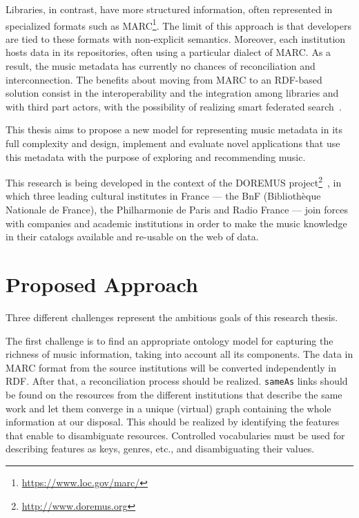 \documentclass{llncs}
\begin{document}
Libraries, in contrast, have more structured information, often represented in specialized formats such as MARC\footnote{\url{https://www.loc.gov/marc/}}. The limit of this approach is that developers are tied to these formats with non-explicit semantics. Moreover, each institution hosts data in its repositories, often using a particular dialect of MARC. As a result, the music metadata has currently no chances of reconciliation and interconnection. The benefits about moving from MARC to an RDF-based solution consist in the interoperability and the integration among libraries and with third part actors, with the possibility of realizing smart federated search~\cite{byrne2010strongest}.

This thesis aims to propose a new model for representing music metadata in its full complexity and design, implement and evaluate novel applications that use this metadata with the purpose of exploring and recommending music.

This research is being developed in the context of the DOREMUS project\footnote{\url{http://www.doremus.org}}~\cite{achichidoremus}, in which three leading cultural institutes in France --- the BnF (Biblioth\`eque Nationale de France), the Philharmonie de Paris and Radio France --- join forces with companies and academic institutions in order to make the music knowledge in their catalogs available and re-usable on the web of data.


\section{Proposed Approach}
\label{sec:approach}
Three different challenges represent the ambitious goals of this research thesis.

The first challenge is to find an appropriate ontology model for capturing the richness of music information, taking into account all its components. The data in MARC format from the source institutions will be converted independently in RDF. After that, a reconciliation process should be realized. \texttt{sameAs} links should be found on the resources from the different institutions that describe the same work and let them converge in a unique (virtual) graph containing the whole information at our disposal. This should be realized by identifying the features that enable to disambiguate resources. Controlled vocabularies must be used for describing features as keys, genres, etc., and disambiguating their values.
\end{document}
